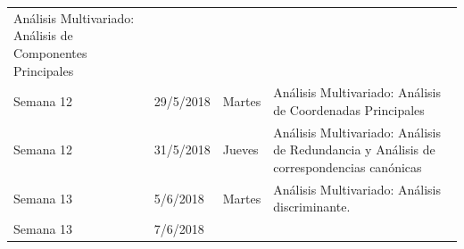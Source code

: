 \documentclass[]{book}
\theoremstyle{definition}
\theoremstyle{definition}
\theoremstyle{definition}
\theoremstyle{remark}
\begin{document}
\begin{longtable}[]{@{}llll@{}}
\begin{minipage}[t]{0.69\columnwidth}
Análisis Multivariado: Análisis de Componentes Principales\strut
\end{minipage}\tabularnewline
\begin{minipage}[t]{0.07\columnwidth}\raggedright
Semana 12\strut
\end{minipage} & \begin{minipage}[t]{0.07\columnwidth}\raggedright
29/5/2018\strut
\end{minipage} & \begin{minipage}[t]{0.05\columnwidth}\raggedright
Martes\strut
\end{minipage} & \begin{minipage}[t]{0.69\columnwidth}\raggedright
Análisis Multivariado: Análisis de Coordenadas Principales\strut
\end{minipage}\tabularnewline
\begin{minipage}[t]{0.07\columnwidth}\raggedright
Semana 12\strut
\end{minipage} & \begin{minipage}[t]{0.07\columnwidth}\raggedright
31/5/2018\strut
\end{minipage} & \begin{minipage}[t]{0.05\columnwidth}\raggedright
Jueves\strut
\end{minipage} & \begin{minipage}[t]{0.69\columnwidth}\raggedright
Análisis Multivariado: Análisis de Redundancia y Análisis de
correspondencias canónicas\strut
\end{minipage}\tabularnewline
\begin{minipage}[t]{0.07\columnwidth}\raggedright
Semana 13\strut
\end{minipage} & \begin{minipage}[t]{0.07\columnwidth}\raggedright
5/6/2018\strut
\end{minipage} & \begin{minipage}[t]{0.05\columnwidth}\raggedright
Martes\strut
\end{minipage} & \begin{minipage}[t]{0.69\columnwidth}\raggedright
Análisis Multivariado: Análisis discriminante.\strut
\end{minipage}\tabularnewline
\begin{minipage}[t]{0.07\columnwidth}\raggedright
Semana 13\strut
\end{minipage} & \begin{minipage}[t]{0.07\columnwidth}\raggedright
7/6/2018\strut
\end{minipage} & \begin{minipage}[t]{0.05\columnwidth}\raggedright

\end{minipage}
\end{longtable}
\end{document}
